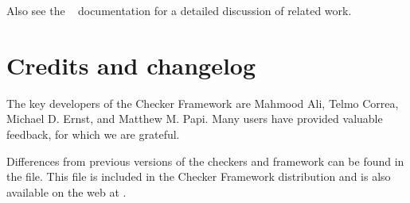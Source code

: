 Also see the
~\cite{jsr308}
documentation for a detailed discussion of related work.



\section{Credits and changelog\label{credits}}

The key developers of the Checker Framework are Mahmood Ali, Telmo Correa,
Michael D. Ernst, and Matthew M. Papi.
Many users have provided valuable feedback, for which we are grateful.


Differences from previous versions of the checkers and framework can be found
in the  file.  This file is included in the
Checker Framework distribution and is also available on the web at
.






